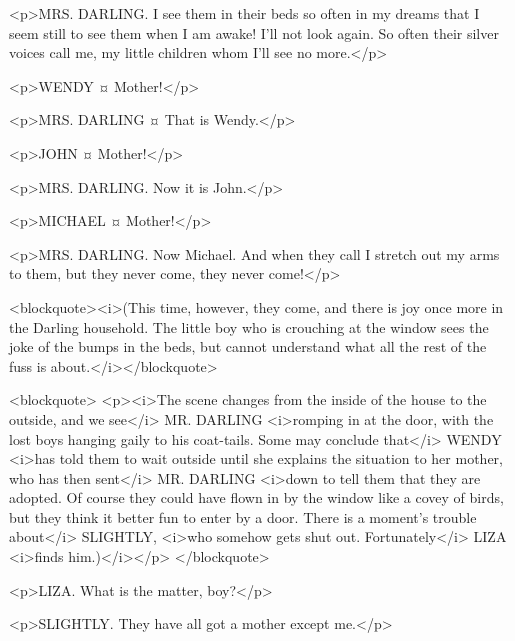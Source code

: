 
<p>MRS. DARLING. I see them in their beds so often in my dreams that I seem still to see them when I am awake! I'll not look again.
So often their silver voices call me, my little children whom I'll see no more.</p>


<p>WENDY ¤
Mother!</p>

<p>MRS. DARLING ¤
That is Wendy.</p>

<p>JOHN ¤
Mother!</p>

<p>MRS. DARLING. Now it is John.</p>

<p>MICHAEL ¤
Mother!</p>

<p>MRS. DARLING. Now Michael. And when they call I stretch out my arms to them, but they never come, they never come!</p>

<blockquote><i>(This time, however, they come, and there is joy once more in the Darling household. The little boy who is crouching at the window sees the joke of the bumps in the beds, but cannot understand what all the rest of the fuss is about.</i></blockquote>

<blockquote> <p><i>The scene changes from the inside of the house to the outside, and we see</i> MR. DARLING <i>romping in at the door, with the lost boys hanging gaily to his coat-tails. Some may conclude that</i> WENDY <i>has told them to wait outside until she explains the situation to her mother, who has then sent</i> MR. DARLING <i>down to tell them that they are adopted. Of course they could have flown in by the window like a covey of birds, but they think it better fun to enter by a door. There is a moment's trouble about</i> SLIGHTLY, <i>who somehow gets shut out. Fortunately</i> LIZA <i>finds him.)</i></p> </blockquote>

<p>LIZA. What is the matter, boy?</p>

<p>SLIGHTLY. They have all got a mother except me.</p>

